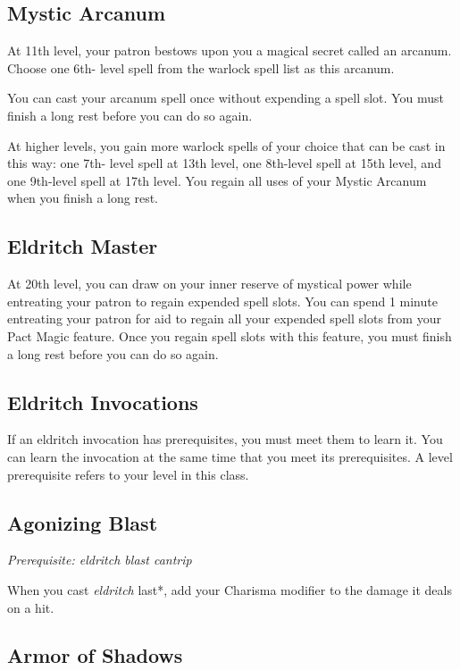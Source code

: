 \subsection{Mystic Arcanum}

At 11th level, your patron bestows upon you a magical secret called an arcanum. Choose one 6th- level spell from the warlock spell list as this arcanum.

You can cast your arcanum spell once without expending a spell slot. You must finish a long rest before you can do so again.

At higher levels, you gain more warlock spells of your choice that can be cast in this way: one 7th- level spell at 13th level, one 8th-level spell at 15th level, and one 9th-level spell at 17th level. You regain all uses of your Mystic Arcanum when you finish a long rest.

\subsection{Eldritch Master}

At 20th level, you can draw on your inner reserve of mystical power while entreating your patron to regain expended spell slots. You can spend 1 minute entreating your patron for aid to regain all your expended spell slots from your Pact Magic feature. Once you regain spell slots with this feature, you must finish a long rest before you can do so again.

\subsection{Eldritch Invocations}

If an eldritch invocation has prerequisites, you must meet them to learn it. You can learn the invocation at the same time that you meet its prerequisites. A level prerequisite refers to your level in this class.

\subsection{Agonizing Blast}

\textit{Prerequisite: eldritch blast cantrip}

When you cast \textit{eldritch }last*, add your Charisma modifier to the damage it deals on a hit.

\subsection{Armor of Shadows}

